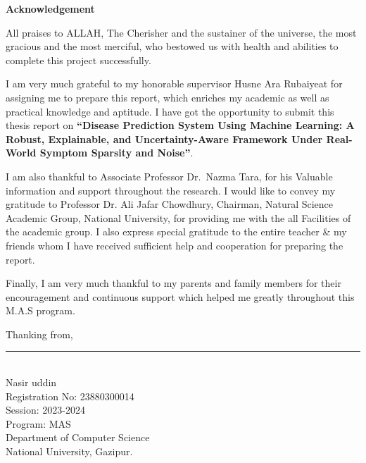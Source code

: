\begin{singlespace}
{\noindent\LARGE\bfseries Acknowledgement\par}
\vspace{1.5em}

\noindent All praises to ALLAH, The Cherisher and the sustainer of the universe, the most gracious and the most merciful, who bestowed us with health and abilities to complete this project successfully.\par

\vspace{0.9em}

\noindent I am very much grateful to my honorable supervisor Husne Ara Rubaiyeat for assigning me to prepare this report, which enriches my academic as well as practical knowledge and aptitude. I have got the opportunity to submit this thesis report on \textbf{``Disease Prediction System Using Machine Learning: A Robust, Explainable, and Uncertainty-Aware Framework Under Real-World Symptom Sparsity and Noise''}.\par

\vspace{0.9em}

\noindent I am also thankful to Associate Professor Dr.~Nazma Tara, for his Valuable information and support throughout the research. I would like to convey my gratitude to Professor Dr. Ali Jafar Chowdhury, Chairman, Natural Science Academic Group, National University, for providing me with the all Facilities of the academic group. I also express special gratitude to the entire teacher \& my friends whom I have received sufficient help and cooperation for preparing the report.\par

\vspace{0.9em}

\noindent Finally, I am very much thankful to my parents and family members for their encouragement and continuous support which helped me greatly throughout this M.A.S program.\par

\vspace{1.8em}

\noindent Thanking from,\par

\vspace{2.2em}

\noindent \rule{5.5cm}{0.5pt}\\
Nasir uddin\\
Registration No: 23880300014\\
Session: 2023-2024\\
Program: MAS\\
Department of Computer Science\\
National University, Gazipur.
\end{singlespace}
\clearpage
